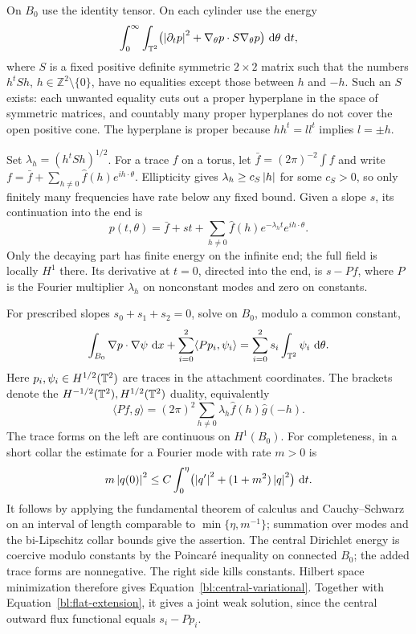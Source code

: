 On $B_0$ use the identity tensor.  On each cylinder use the energy
\begin{equation}\label{bl:flat-energy}
 \int_0^\infty\int_{\mathbb T^2}
 \bigl(\left\lvert \partial_t p\right\rvert^2+
       \nabla_\theta p\cdot S\nabla_\theta p\bigr)
 \,\,\mathrm d\theta\,\,\mathrm d t,
\end{equation}
where $S$ is a fixed positive definite symmetric $2\times2$ matrix such
that the numbers $h^tSh$, $h\in\mathbb Z^2\setminus\{0\}$, have no
equalities except those between $h$ and $-h$.  Such an $S$ exists:
each unwanted equality cuts out a proper hyperplane in the space of
symmetric matrices, and countably many proper hyperplanes do not cover
the open positive cone.  The hyperplane is proper because
$hh^t=ll^t$ implies $l=\pm h$.

Set $\lambda_h=(h^tSh)^{1/2}$.  For a trace $f$ on a torus, let
$\bar f=(2\pi)^{-2}\int f$ and write
$f=\bar f+\sum_{h\ne0}\widehat f(h)e^{ih\cdot\theta}$.
Ellipticity gives $\lambda_h\ge c_S\left\lvert h\right\rvert$ for some $c_S>0$, so only
finitely many frequencies have rate below any fixed bound.
Given a slope $s$, its continuation into the end is
\begin{equation}\label{bl:flat-extension}
 p(t,\theta)=\bar f+st+
       \sum_{h\ne0}\widehat f(h)e^{-\lambda_h t}e^{ih\cdot\theta}.
\end{equation}
Only the decaying part has finite energy on the infinite end; the full
field is locally $H^1$ there.  Its derivative at $t=0$, directed into the
end, is $s-Pf$, where $P$ is the Fourier multiplier $\lambda_h$ on
nonconstant modes and zero on constants.

For prescribed slopes $s_0+s_1+s_2=0$, solve on $B_0$, modulo a common
constant,
\begin{equation}\label{bl:central-variational}
 \int_{B_0}\nabla p\cdot\nabla\psi\,\,\mathrm d x
 +\sum_{i=0}^2\langle Pp_i,\psi_i\rangle
   =\sum_{i=0}^2s_i\int_{\mathbb T^2}\psi_i\,\,\mathrm d\theta.
\end{equation}
Here $p_i,\psi_i\in H^{1/2}(\mathbb T^2)$ are traces in the attachment
coordinates.  The brackets denote the
$H^{-1/2}(\mathbb T^2),H^{1/2}(\mathbb T^2)$ duality, equivalently
\[
 \langle Pf,g\rangle
   =(2\pi)^2\sum_{h\ne0}\lambda_h\widehat f(h)\widehat g(-h).
\]
The trace forms on the left are continuous on $H^1(B_0)$.  For
completeness, in a short collar the estimate for a Fourier mode with
rate $m>0$ is
\[
 m\left\lvert q(0)\right\rvert^2\le C\int_0^\eta
       \bigl(\left\lvert q'\right\rvert^2+(1+m^2)\left\lvert q\right\rvert^2\bigr)\,\,\mathrm d t.
\]
It follows by applying the fundamental theorem of calculus and
Cauchy--Schwarz on an interval of length comparable to
$\min\{\eta,m^{-1}\}$; summation over modes and the bi-Lipschitz collar
bounds give the assertion.  The central Dirichlet energy is coercive
modulo constants by the Poincar\'e inequality on connected $B_0$; the added
trace forms are nonnegative.  The right side kills constants.  Hilbert
space minimization therefore gives Equation~\eqref{bl:central-variational}.
Together with Equation~\eqref{bl:flat-extension}, it gives a joint weak
solution, since the central outward flux functional equals $s_i-Pp_i$.

